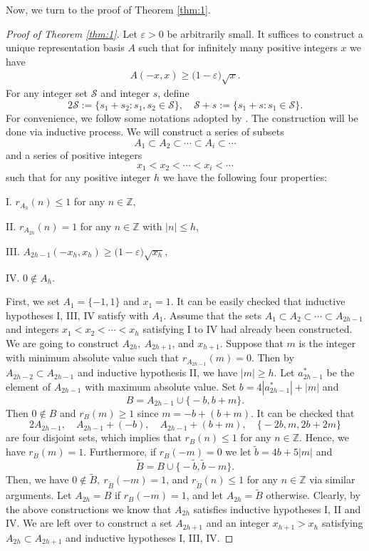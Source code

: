 \documentclass[12pt,a4paper,reqno]{amsart}
\numberwithin{equation}{section}
\theoremstyle{plain}
\theoremstyle{definition}
\begin{document}
Now, we turn to the proof of Theorem \ref{thm:1}.
\begin{proof}[Proof of Theorem \ref{thm:1}]
Let $\varepsilon>0$ be arbitrarily small. It suffices to construct a unique representation basis $A$ such that for infinitely many positive integers $x$ we have
\begin{align}\label{eq-0204-4}
A(-x,x)\ge \big(1-\varepsilon\big)\sqrt{x}.
\end{align}
For any integer set $\mathcal{S}$ and integer $s$, define
$$
2\mathcal{S}:=\big\{s_1+s_2: s_1, s_2\in \mathcal{S}\big\}, \quad \mathcal{S}+s:=\{s_1+s: s_1\in \mathcal{S}\}.
$$
For convenience, we follow some notations adopted by \cite{Ding}.
The construction will be done via inductive process. 
We will construct a series of subsets
$$
A_1\subset A_2\subset\cdots \subset A_i\subset\cdots
$$
and a series of positive integers
$$
x_1<x_2<\cdots<x_i<\cdots
$$
such that for any positive integer $h$ we have the following four properties:

I. $r_{A_h}(n)\le 1$ for any $n\in \mathbb{Z}$,

II. $r_{A_{2h}}(n)=1$ for any $n\in \mathbb{Z}$ with $|n|\le h$,

III. $A_{2h-1}(-x_h,x_h)\ge \big(1-\varepsilon\big)\sqrt{x_h},$

IV. $0\not\in A_h$.

\medskip

First, we set $A_1=\{-1,1\}$ and $x_1=1$. It can be easily checked that inductive hypotheses I, III, IV satisfy with $A_1$. Assume that the sets $A_1\subset A_2\subset\cdots \subset A_{2h-1}$ and integers $x_1<x_2<\cdots<x_h$ satisfying I to IV had already been constructed. We are going to construct $A_{2h},\ A_{2h+1}$, and $x_{h+1}$. Suppose that $m$ is the integer with minimum absolute value such that $r_{A_{2h-1}}(m)=0$. Then by $A_{2h-2}\subset A_{2h-1}$ and inductive hypothesis II, we have $|m|\ge h$. 
Let $a^*_{2h-1}$ be the element of $A_{2h-1}$ with maximum absolute value. Set
$
b=4|a^*_{2h-1}|+|m|
$
and
$$
B=A_{2h-1}\cup\big\{-b,b+m\big\}.
$$
Then $0\not\in B$ and $r_B(m)\ge 1$ since $m=-b+(b+m)$. It can be checked that 
$$
2A_{2h-1}, \quad A_{2h-1}+(-b), \quad  A_{2h-1}+(b+m), \quad  \big\{-2b, m, 2b+2m\big\}
$$
are four disjoint sets, which implies that $r_B(n)\le 1$ for any $n\in \mathbb{Z}$. Hence, we have $r_B(m)= 1$. Furthermore, if $r_B(-m)=0$ we let $\widetilde{b}=4b+5|m|$ and
$$
\widetilde{B}=B\cup\big\{-\widetilde{b},\widetilde{b}-m\big\}.
$$
Then, we have $0\not\in \widetilde{B},\ r_{\widetilde{B}}(-m)=1$, and $r_{\widetilde{B}}(n)\le 1$ for any $n\in \mathbb{Z}$ via similar arguments.
Let $A_{2h}=B$ if $r_B(-m)=1$, and let $A_{2h}=\widetilde{B}$ otherwise.
Clearly, by the above constructions we know that $A_{2h}$ satisfies inductive hypotheses I, II and IV. We are left over to construct a set $A_{2h+1}$ and an integer $x_{h+1}>x_h$ satisfying $A_{2h}\subset A_{2h+1}$ and inductive hypotheses I, III, IV. 


\end{proof}
\end{document}
